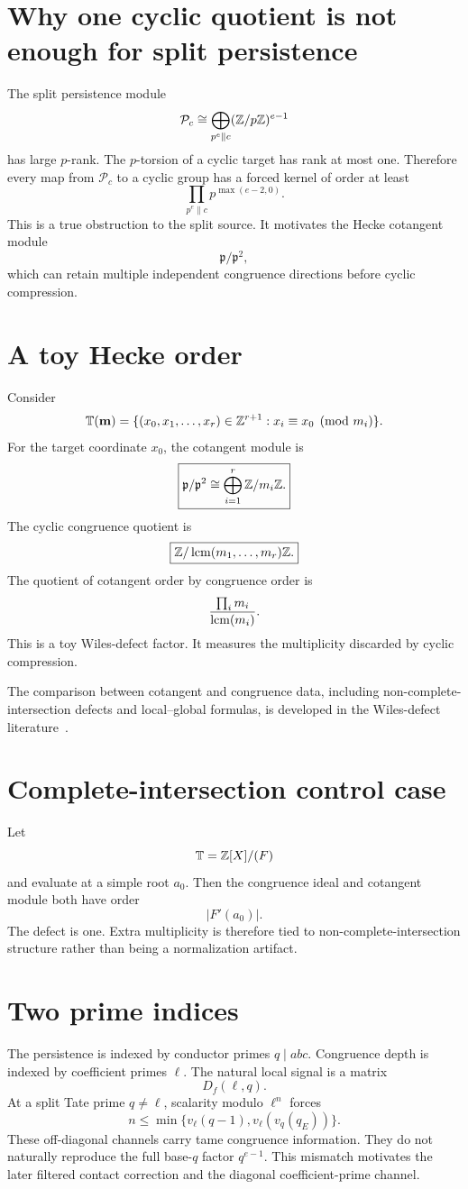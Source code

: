 \section{Why one cyclic quotient is not enough for split persistence}
The split persistence module
\[
 \mathcal P_c
 \cong
 \bigoplus_{p^e\parallel c}
 (\mathbb Z/p\mathbb Z)^{e-1}
\]
has large $p$-rank. The $p$-torsion of a cyclic target has rank at most one. Therefore every map from $\mathcal P_c$ to a cyclic group has a forced kernel of order at least
\[
 \prod_{p^e\parallel c}p^{\max(e-2,0)}.
\]
This is a true obstruction to the split source. It motivates the Hecke cotangent module
\[
 \mathfrak p/\mathfrak p^2,
\]
which can retain multiple independent congruence directions before cyclic compression.

\section{A toy Hecke order}
Consider
\[
 \mathbb T(\mathbf m)
 =
 \{(x_0,x_1,\ldots,x_r)\in\mathbb Z^{r+1}:x_i\equiv x_0\pmod{m_i}\}.
\]
For the target coordinate $x_0$, the cotangent module is
\[
 \boxed{
 \mathfrak p/\mathfrak p^2
 \cong
 \bigoplus_{i=1}^{r}\mathbb Z/m_i\mathbb Z.
 }
\]
The cyclic congruence quotient is
\[
 \boxed{
 \mathbb Z/\operatorname{lcm}(m_1,\ldots,m_r)\mathbb Z.
 }
\]
The quotient of cotangent order by congruence order is
\[
 \frac{\prod_i m_i}{\operatorname{lcm}(m_i)}.
\]
This is a toy Wiles-defect factor. It measures the multiplicity discarded by cyclic compression.

The comparison between cotangent and congruence data, including non-complete-intersection defects and local--global formulas, is developed in the Wiles-defect literature~\cite{BKM1,BKM2}.

\section{Complete-intersection control case}
Let
\[
 \mathbb T=\mathbb Z[X]/(F)
\]
and evaluate at a simple root $a_0$. Then the congruence ideal and cotangent module both have order
\[
 |F'(a_0)|.
\]
The defect is one. Extra multiplicity is therefore tied to non-complete-intersection structure rather than being a normalization artifact.

\section{Two prime indices}
The persistence is indexed by conductor primes $q\mid abc$. Congruence depth is indexed by coefficient primes $\ell$. The natural local signal is a matrix
\[
 D_f(\ell,q).
\]
At a split Tate prime $q\neq\ell$, scalarity modulo $\ell^n$ forces
\[
 n\le\min\{v_\ell(q-1),v_\ell(v_q(q_E))\}.
\]
These off-diagonal channels carry tame congruence information. They do not naturally reproduce the full base-$q$ factor $q^{e-1}$. This mismatch motivates the later filtered contact correction and the diagonal coefficient-prime channel.

